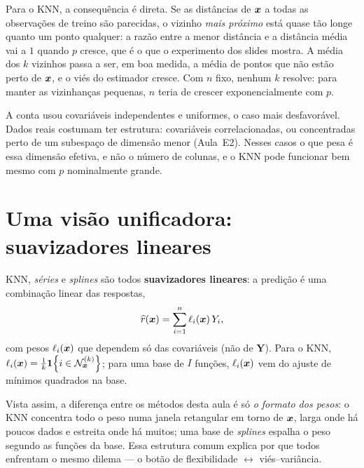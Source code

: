 \documentclass[11pt,a4paper]{article}
\begin{document}
Para o KNN, a consequência é direta. Se as distâncias de $\bm{x}$ a todas as observações
de treino são parecidas, o vizinho \emph{mais próximo} está quase tão longe quanto um
ponto qualquer: a razão entre a menor distância e a distância média vai a $1$ quando
$p$ cresce, que é o que o experimento dos slides mostra. A média dos $k$ vizinhos
passa a ser, em boa medida, a média de pontos que não estão perto de $\bm{x}$, e o viés
do estimador cresce. Com $n$ fixo, nenhum $k$ resolve: para manter as vizinhanças
pequenas, $n$ teria de crescer exponencialmente com $p$.

\begin{atencao}
A conta usou covariáveis independentes e uniformes, o caso mais desfavorável. Dados
reais costumam ter estrutura: covariáveis correlacionadas, ou concentradas perto de um
subespaço de dimensão menor (Aula~E2). Nesses casos o que pesa é essa dimensão
efetiva, e não o número de colunas, e o KNN pode funcionar bem mesmo com $p$
nominalmente grande.
\end{atencao}

\section{Uma visão unificadora: suavizadores lineares}
KNN, \emph{séries} e \emph{splines} são todos
\textbf{suavizadores lineares}: a predição é uma combinação linear das respostas,
\[
  \widehat{r}(\bm{x}) = \sum_{i=1}^n \ell_i(\bm{x})\,Y_i,
\]
com pesos $\ell_i(\bm{x})$ que dependem só das covariáveis (não de $\bm{Y}$). Para o
KNN, $\ell_i(\bm{x})=\tfrac1k\mathbf{1}\!\left\{i\in\mathcal{N}_{\bm{x}}^{(k)}\right\}$; para uma base de $I$ funções,
$\ell_i(\bm{x})$ vem do ajuste de mínimos quadrados na base.

\begin{ideia}
Vista assim, a diferença entre os métodos desta aula é só \emph{o formato dos
pesos}: o KNN concentra todo o peso numa janela retangular em torno de $\bm{x}$, larga
onde há poucos dados e estreita onde há muitos; uma base de \emph{splines} espalha
o peso segundo as funções da base. Essa estrutura comum explica por que todos
enfrentam o mesmo dilema --- o botão de flexibilidade $\leftrightarrow$
viés--variância.
\end{ideia}
\end{document}

